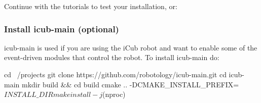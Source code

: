 Continue with the tutorials to test your installation, or\+:

\subsubsection*{Install icub-\/main (optional)}

{\ttfamily icub-\/main} is used if you are using the i\+Cub robot and want to enable some of the {\ttfamily event-\/driven} modules that control the robot. To install {\ttfamily icub-\/main} do\+: 
\begin{DoxyCode}
cd ~/projects
git clone https://github.com/robotology/icub-main.git
cd icub-main
mkdir build && cd build
cmake .. -DCMAKE\_INSTALL\_PREFIX=$INSTALL\_DIR
make install -j$(nproc)
\end{DoxyCode}
 
